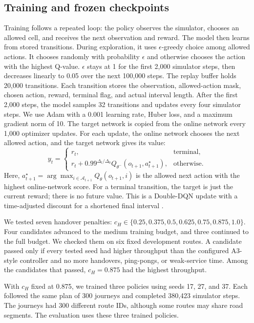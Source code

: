 \documentclass[fleqn,10pt,twoside]{IOEGC}
\begin{document}
\subsection{Training and frozen checkpoints}
Training follows a repeated loop: the policy observes the simulator, chooses an allowed cell, and receives the next observation and reward. The model then learns from stored transitions. During exploration, it uses $\epsilon$-greedy choice among allowed actions. It chooses randomly with probability $\epsilon$ and otherwise chooses the action with the highest Q-value. $\epsilon$ stays at 1 for the first 2,000 simulator steps, then decreases linearly to 0.05 over the next 100,000 steps. The replay buffer holds 20,000 transitions. Each transition stores the observation, allowed-action mask, chosen action, reward, terminal flag, and actual interval length. After the first 2,000 steps, the model samples 32 transitions and updates every four simulator steps. We use Adam with a 0.001 learning rate, Huber loss, and a maximum gradient norm of 10. The target network is copied from the online network every 1,000 optimizer updates. For each update, the online network chooses the next allowed action, and the target network gives its value:
\begin{equation}
 y_t=\begin{cases}
 r_t,&\text{terminal},\\
 r_t+0.99^{\Delta_t/\Delta_0}Q_{\theta^-}(o_{t+1},a_{t+1}^{\star}),&\text{otherwise}.
 \end{cases}
 \label{eq:target}
\end{equation}
Here, $a_{t+1}^{\star}=\arg\max_{i\in\mathcal{A}_{t+1}}Q_\theta(o_{t+1},i)$ is the allowed next action with the highest online-network score. For a terminal transition, the target is just the current reward; there is no future value. This is a Double-DQN update with a time-adjusted discount for a shortened final interval \cite{mnih2015,vanhasselt2016,velickovic2018,wang2016}.

We tested seven handover penalties: $c_H\in\{0.25,0.375,0.5,0.625,0.75,0.875,1.0\}$. Four candidates advanced to the medium training budget, and three continued to the full budget. We checked them on six fixed development routes. A candidate passed only if every tested seed had higher throughput than the configured A3-style controller and no more handovers, ping-pongs, or weak-service time. Among the candidates that passed, $c_H=0.875$ had the highest throughput.

With $c_H$ fixed at 0.875, we trained three policies using seeds 17, 27, and 37. Each followed the same plan of 300 journeys and completed 380,423 simulator steps. The journeys had 300 different route IDs, although some routes may share road segments. The evaluation uses these three trained policies.
\end{document}
